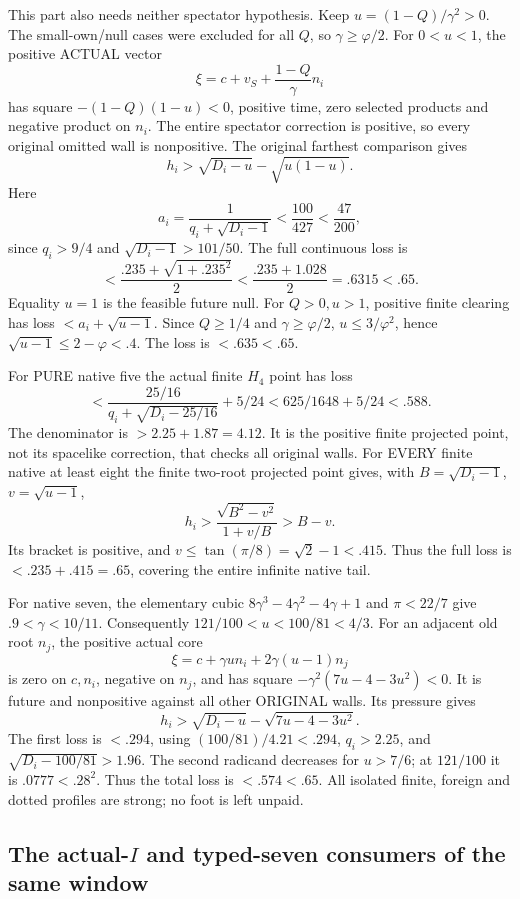 \documentclass[11pt]{article}
\begin{document}
This part also needs neither spectator
hypothesis.  Keep
\(u=(1-Q)/\gamma^2>0\).
The small-own/null cases were excluded for
all \(Q\), so \(\gamma\ge\varphi/2\).
For \(0<u<1\), the positive ACTUAL vector
\[
        \xi=c+v_S+{\frac{1-Q}{\gamma}}n_i
\]
has square \(-(1-Q)(1-u)<0\), positive
time, zero selected products and negative
product on \(n_i\).
The entire spectator correction is positive,
so every original omitted wall is nonpositive.
The original farthest comparison gives
\[
 h_i>\sqrt{D_i-u}-\sqrt{u(1-u)} .
\]
Here
\[
 a_i={\frac{1}{q_i+\sqrt{D_i-1}}}<{\frac{100}{427}}<{\frac{47}{200}},
\]
since \(q_i>9/4\) and
\(\sqrt{D_i-1}>101/50\).
The full continuous loss is
\[
 <{\frac{.235+\sqrt{1+.235^2}}{2}}
 <{\frac{.235+1.028}{2}}=.6315<.65 .
\]
Equality \(u=1\) is the feasible future null.
For \(Q>0,u>1\), positive finite clearing
has loss \(<a_i+\sqrt{u-1}\).
Since \(Q\ge1/4\) and \(\gamma\ge\varphi/2\),
\(u\le3/\varphi^2\), hence
\(\sqrt{u-1}\le2-\varphi<.4\).
The loss is \(<.635<.65\).

For PURE native five the actual finite
\(H_4\) point has loss
\[
 <{\frac{25/16}{q_i+\sqrt{D_i-25/16}}}+5/24
              <625/1648+5/24<.588 .
\]
The denominator is \(>2.25+1.87=4.12\).
It is the positive finite projected point,
not its spacelike correction, that checks
all original walls.
For EVERY finite native at least eight
the finite two-root projected point gives,
with \(B=\sqrt{D_i-1}\), \(v=\sqrt{u-1}\),
\[
 h_i>{\frac{\sqrt{B^2-v^2}}{1+v/B}}>B-v .
\]
Its bracket is positive, and
\(v\le\tan(\pi/8)=\sqrt2-1<.415\).
Thus the full loss is \(<.235+.415=.65\),
covering the entire infinite native tail.

For native seven, the elementary cubic
\(8\gamma^3-4\gamma^2-4\gamma+1\) and
\(\pi<22/7\) give \(.9<\gamma<10/11\).
Consequently \(121/100<u<100/81<4/3\).
For an adjacent old root \(n_j\), the
positive actual core
\[
             \xi=c+\gamma un_i+2\gamma(u-1)n_j
\]
is zero on \(c,n_i\), negative on \(n_j\),
and has square
\(-\gamma^2(7u-4-3u^2)<0\).
It is future and nonpositive against all
other ORIGINAL walls.
Its pressure gives
\[
 h_i>\sqrt{D_i-u}-\sqrt{7u-4-3u^2}.
\]
The first loss is \(<.294\), using
\((100/81)/4.21<.294\),
\(q_i>2.25\), and
\(\sqrt{D_i-100/81}>1.96\).
The second radicand decreases for \(u>7/6\);
at \(121/100\) it is \(.0777<.28^2\).
Thus the total loss is \(<.574<.65\).
All isolated finite, foreign and dotted
profiles are strong; no foot is left unpaid.

\subsection[The actual-I and typed-seven consumers of the same window]{The actual-\(I\) and typed-seven consumers of the same window}
\label{app:arithA10consumers}
\end{document}

